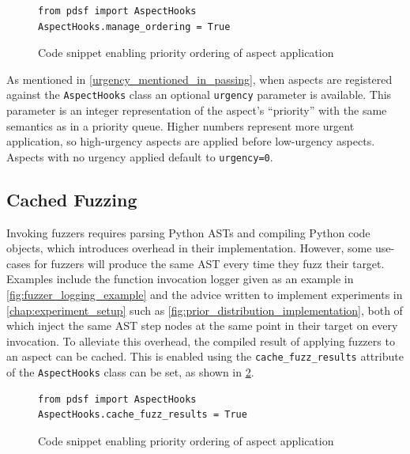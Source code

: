 \begin{figure}[h]
    \begin{lstlisting}[style=footnotesize_python]
from pdsf import AspectHooks
AspectHooks.manage_ordering = True
    \end{lstlisting}
    \caption{Code snippet enabling priority ordering of aspect application}
    \label{fig:enabling_priority_sorting_of_aspects}
\end{figure}

As mentioned in \cref{urgency_mentioned_in_passing}, when aspects are registered
against the \lstinline{AspectHooks} class an optional \lstinline{urgency}
parameter is available. This parameter is an integer representation of the
aspect's ``priority'' with the same semantics as in a priority queue. Higher
numbers represent more urgent application, so high-urgency aspects are applied
before low-urgency aspects. Aspects with no urgency applied default to
\lstinline{urgency=0}.


\subsection{Cached Fuzzing}
\label{subsec:cached_fuzzing}

Invoking fuzzers requires parsing Python ASTs and compiling Python code objects,
which introduces overhead in their implementation. However, some use-cases for
fuzzers will produce the same AST every time they fuzz their target. Examples
include the function invocation logger given as an example in
\cref{fig:fuzzer_logging_example} and the advice written to implement
experiments in \cref{chap:experiment_setup} such as
\cref{fig:prior_distribution_implementation}, both of which inject the same AST
step nodes at the same point in their target on every invocation. To alleviate
this overhead, the compiled result of applying fuzzers to an aspect can be
cached. This is enabled using the \lstinline{cache_fuzz_results} attribute of
the \lstinline{AspectHooks} class can be set, as shown in
\cref{fig:enabling_fuzzer_caching}.

\begin{figure}[h]
    \begin{lstlisting}[style=footnotesize_python]
from pdsf import AspectHooks
AspectHooks.cache_fuzz_results = True
    \end{lstlisting}
    \caption{Code snippet enabling priority ordering of aspect application}
    \label{fig:enabling_fuzzer_caching}
\end{figure}



